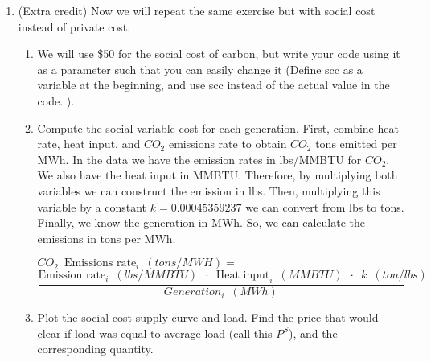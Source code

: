 \documentclass[11pt]{article}
\begin{document}
\begin{enumerate}
\item (Extra credit) Now we will repeat the same exercise but with social cost instead of private cost.
	\begin{enumerate}
	\item 	We will use \$50 for the social cost of carbon, but write your code using it as a parameter such that you can easily change it (Define scc as a variable at the beginning, and use scc instead of the actual value in the code.  ). 
	\item Compute the social variable cost for each generation. First, combine heat rate, heat input, and $CO_2$ emissions rate to obtain $CO_2$ tons emitted per MWh. In the data we have the emission rates in lbs/MMBTU for $CO_2$. We also have the heat input in MMBTU.  Therefore, by multiplying both variables we can construct the emission in lbs.  Then, multiplying this variable by a constant $k=0.00045359237$ we can convert from lbs to tons. Finally, we know the generation in MWh. So, we can calculate the emissions in tons per MWh.
	
	 $CO_2 \enspace \text{Emissions rate}_i \enspace (tons/MWH) =$
		\begin{equation*}
			 \frac{\text{Emission rate}_i \enspace (lbs/MMBTU) \enspace \cdot \enspace \text{Heat input}_i \enspace (MMBTU) \enspace \cdot \enspace k \enspace (ton/lbs)}{Generation_i \enspace(MWh)}
		\end{equation*}
	\item Plot the social cost supply curve and load. Find the price that would clear if load was equal to average load (call this $P^S$), and the corresponding quantity. 
	\end{enumerate}
	

\end{enumerate}
\end{document}
